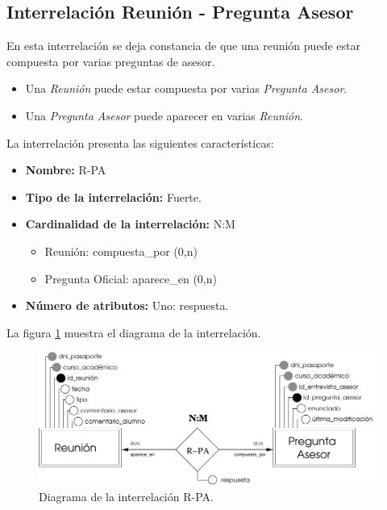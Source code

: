 \subsection{Interrelación Reunión - Pregunta Asesor}

   \begin{description}
      \item[Definición] En esta interrelación se deja constancia de que una
      reunión puede estar compuesta por varias preguntas de asesor.

      \begin{itemize}
       \item Una \textit{Reunión} puede estar compuesta por varias
             \textit{Pregunta Asesor}.
       \item Una \textit{Pregunta Asesor} puede aparecer en varias
             \textit{Reunión}.
      \end{itemize}

      \item[Características] La interrelación presenta las siguientes
                             características:

         \begin{itemize}
            \item \textbf{Nombre:} R-PA
            \item \textbf{Tipo de la interrelación:} Fuerte.
            \item \textbf{Cardinalidad de la interrelación:} N:M
                  \begin{itemize}
                     \item Reunión: compuesta\_por (0,n)
                     \item Pregunta Oficial: aparece\_en (0,n)
                  \end{itemize}
            \item \textbf{Número de atributos:} Uno: respuesta.
         \end{itemize}

      \item[Diagrama] La figura \ref{diagramaR-PA} muestra el diagrama de la
                      interrelación.

      \item \begin{figure}[!ht]
            \begin{center}
            \includegraphics[]{07.Modelo_Entidad-Interrelacion/7.3.Analisis_Interrelaciones/diagramas/R-PA.pdf}
            \caption{Diagrama de la interrelación R-PA.}
            \label{diagramaR-PA}
            \end{center}
         \end{figure}


\end{description}
